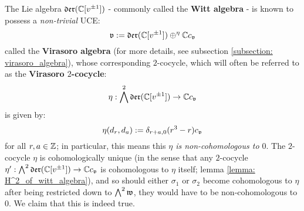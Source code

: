         The Lie algebra $\mathfrak{der}(\mathbb{C}[v^{\pm 1}])$ - commonly called the \textbf{Witt algebra} - is known to possess a \textit{non-trivial} UCE:
            $$\mathfrak{v} := \mathfrak{der}(\mathbb{C}[v^{\pm 1}]) \oplus^{\eta} \mathbb{C} c_{\mathfrak{v}}$$
        called the \textbf{Virasoro algebra} (for more details, see subsection \ref{subsection: virasoro_algebra}), whose corresponding $2$-cocycle, which will often be referred to as the \textbf{Virasoro $2$-cocycle}:
            $$\eta: \bigwedge^2 \mathfrak{der}(\mathbb{C}[v^{\pm 1}]) \to \mathbb{C} c_{\mathfrak{v}}$$
        is given by:
            $$\eta(d_r, d_a) := \delta_{r + a, 0} (r^3 - r) c_{\mathfrak{v}}$$
        for all $r, a \in \mathbb{Z}$; in particular, this means this \textit{$\eta$ is non-cohomologous to $0$}. The $2$-cocycle $\eta$ is cohomologically unique (in the sense that any $2$-cocycle $\eta': \bigwedge^2 \mathfrak{der}(\mathbb{C}[v^{\pm 1}]) \to \mathbb{C} c_{\mathfrak{v}}$ is cohomologous to $\eta$ itself; lemma \ref{lemma: H^2_of_witt_algebra}), and so should either $\sigma_1$ or $\sigma_2$ become cohomologous to $\eta$ after being restricted down to $\bigwedge^2 \mathfrak{w}$, they would have to be non-cohomologous to $0$. We claim that this is indeed true.


